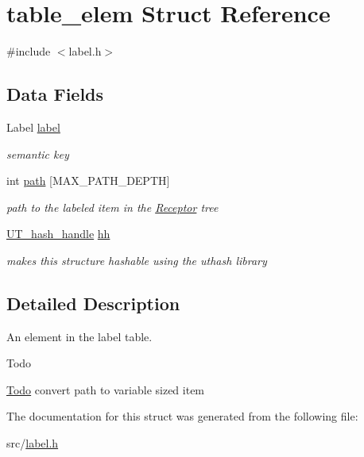 \hypertarget{structtable__elem}{\section{table\+\_\+elem Struct Reference}
\label{structtable__elem}
}


{\ttfamily \#include $<$label.\+h$>$}

\subsection*{Data Fields}
\begin{DoxyCompactItemize}
\item 
\hypertarget{structtable__elem_a30d723ce3d68ee9542448f50f3e80581}{Label \hyperlink{structtable__elem_a30d723ce3d68ee9542448f50f3e80581}{label}}\label{structtable__elem_a30d723ce3d68ee9542448f50f3e80581}

\begin{DoxyCompactList}\small\item\em semantic key \end{DoxyCompactList}\item 
\hypertarget{structtable__elem_a7f0dfec61de22e76596d7c6d090ec6dd}{int \hyperlink{structtable__elem_a7f0dfec61de22e76596d7c6d090ec6dd}{path} \mbox{[}M\+A\+X\+\_\+\+P\+A\+T\+H\+\_\+\+D\+E\+P\+T\+H\mbox{]}}\label{structtable__elem_a7f0dfec61de22e76596d7c6d090ec6dd}

\begin{DoxyCompactList}\small\item\em path to the labeled item in the \hyperlink{structReceptor}{Receptor} tree \end{DoxyCompactList}\item 
\hypertarget{structtable__elem_a75732c638886f4e9c9f91bb5a395fa75}{\hyperlink{structUT__hash__handle}{U\+T\+\_\+hash\+\_\+handle} \hyperlink{structtable__elem_a75732c638886f4e9c9f91bb5a395fa75}{hh}}\label{structtable__elem_a75732c638886f4e9c9f91bb5a395fa75}

\begin{DoxyCompactList}\small\item\em makes this structure hashable using the uthash library \end{DoxyCompactList}\end{DoxyCompactItemize}


\subsection{Detailed Description}
An element in the label table.

\begin{DoxyRefDesc}{Todo}
\item[\hyperlink{todo__todo000001}{Todo}]convert path to variable sized item \end{DoxyRefDesc}


The documentation for this struct was generated from the following file\+:\begin{DoxyCompactItemize}
\item 
src/\hyperlink{label_8h}{label.\+h}\end{DoxyCompactItemize}

